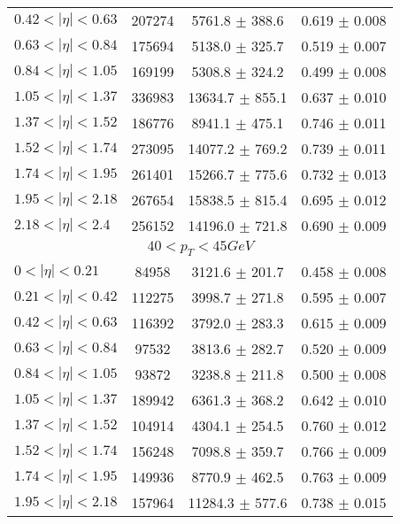 \begin{tabular}{lccc}
$0.42 < |\eta| <0.63$          & 207274     & 5761.8     $\pm$ 388.6 & 0.619      $\pm$ 0.008 \\
$0.63 < |\eta| <0.84$          & 175694     & 5138.0     $\pm$ 325.7 & 0.519      $\pm$ 0.007 \\
$0.84 < |\eta| <1.05$          & 169199     & 5308.8     $\pm$ 324.2 & 0.499      $\pm$ 0.008 \\
$1.05 < |\eta| <1.37$          & 336983     & 13634.7    $\pm$ 855.1 & 0.637      $\pm$ 0.010 \\
$1.37 < |\eta| <1.52$          & 186776     & 8941.1     $\pm$ 475.1 & 0.746      $\pm$ 0.011 \\
$1.52 < |\eta| <1.74$          & 273095     & 14077.2    $\pm$ 769.2 & 0.739      $\pm$ 0.011 \\
$1.74 < |\eta| <1.95$          & 261401     & 15266.7    $\pm$ 775.6 & 0.732      $\pm$ 0.013 \\
$1.95 < |\eta| <2.18$          & 267654     & 15838.5    $\pm$ 815.4 & 0.695      $\pm$ 0.012 \\
$2.18 < |\eta| <2.4$           & 256152     & 14196.0    $\pm$ 721.8 & 0.690      $\pm$ 0.009 \\
\hline
\multicolumn{4}{c}{$40 < p_{T} < 45 GeV$} \\
\hline
$0 < |\eta| <0.21$             & 84958      & 3121.6     $\pm$ 201.7 & 0.458      $\pm$ 0.008 \\
$0.21 < |\eta| <0.42$          & 112275     & 3998.7     $\pm$ 271.8 & 0.595      $\pm$ 0.007 \\
$0.42 < |\eta| <0.63$          & 116392     & 3792.0     $\pm$ 283.3 & 0.615      $\pm$ 0.009 \\
$0.63 < |\eta| <0.84$          & 97532      & 3813.6     $\pm$ 282.7 & 0.520      $\pm$ 0.009 \\
$0.84 < |\eta| <1.05$          & 93872      & 3238.8     $\pm$ 211.8 & 0.500      $\pm$ 0.008 \\
$1.05 < |\eta| <1.37$          & 189942     & 6361.3     $\pm$ 368.2 & 0.642      $\pm$ 0.010 \\
$1.37 < |\eta| <1.52$          & 104914     & 4304.1     $\pm$ 254.5 & 0.760      $\pm$ 0.012 \\
$1.52 < |\eta| <1.74$          & 156248     & 7098.8     $\pm$ 359.7 & 0.766      $\pm$ 0.009 \\
$1.74 < |\eta| <1.95$          & 149936     & 8770.9     $\pm$ 462.5 & 0.763      $\pm$ 0.009 \\
$1.95 < |\eta| <2.18$          & 157964     & 11284.3    $\pm$ 577.6 & 0.738      $\pm$ 0.015 \\

\end{tabular}
